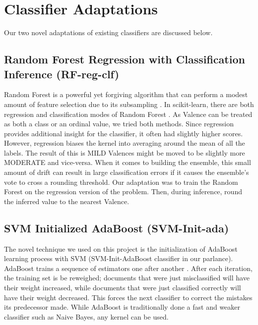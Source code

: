\section{Classifier Adaptations}\label{sec:newml}


Our two novel adaptations of existing classifiers are discussed below. 

\subsection{Random Forest Regression with Classification Inference (RF-reg-clf)}
Random Forest is a powerful yet forgiving algorithm that can perform a modest amount of feature selection due to its subsampling \cite{breiman01, ho95}. In \textsf{scikit-learn}, there are both regression and classification modes of Random Forest \cite{scikit-learn}. As Valence can be treated as both a class or an ordinal value, we tried both methods. Since regression provides additional insight for the classifier, it often had slightly higher scores. However, regression biases the kernel into averaging around the mean of all the labels. The result of this is \textsf{MILD} Valences might be moved to be slightly more \textsf{MODERATE} and vice-versa. When it comes to building the ensemble, this small amount of drift can result in large classification errors if it causes the ensemble's vote to cross a rounding threshold. Our adaptation was to train the Random Forest on the regression version of the problem. Then, during inference, round the inferred value to the nearest Valence. 

\subsection{SVM Initialized AdaBoost (SVM-Init-ada)}
The novel technique we used on this project is the initialization of AdaBoost learning
process with SVM (\textsf{SVM-Init-AdaBoost} classifier in our parlance). AdaBoost trains
a sequence of  estimators one after another \cite{adaboost}. After each iteration, the training set is be reweighed; documents that were just misclassified will have their weight increased, while documents that were just classified correctly will have their weight decreased. This forces the next classifier to correct the mistakes its predecessor made. While AdaBoost is traditionally done a fast and weaker classifier such as Naive Bayes, any kernel can be used. 

